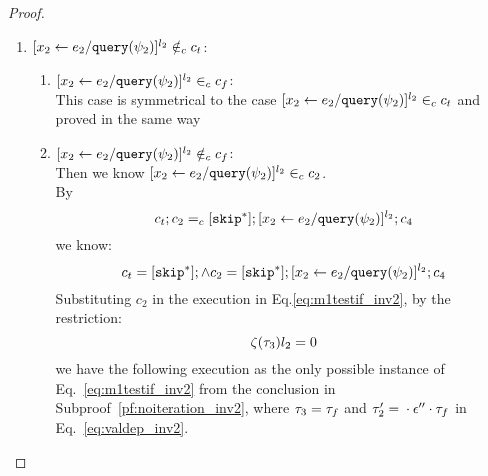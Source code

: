 {\begin{proof}
\begin{subproof}
\begin{enumerate}
we know $\forall \trace, \trace' \in \mathcal{T}$, there doesn't exist execution
 \[
  \config{c_f;c_2, \vtrace} \rightarrow^{*} 
  \config{[\assign{{x}_2}{\expr_2 / \query(\qexpr_2)}]^{l_2};{c}_4', \trace'}
 \]
 This is contradict to the existence of execution in Eq.\ref{eq:m1testif_inv2}.
 \\
 If $[\assign{{x}_2}{\expr_2 / \query(\qexpr_2)}]^{l_2} \in_c c_2$, 
 by uniqueness of label , 
 it must exist in the body of a while command in $c_2$,
 and $\eif ([b]^{l_b}, c_t, c_f) \in_c c_2$ and $[\assign{{x}_2}{\expr_2 / \query(\qexpr_2)}]^{l_2} \in_c c_t$. 
\\
%
i.e., $[\assign{{x}_2}{\expr_2 / \query(\qexpr_2)}]^{l_2}$ will only show up in $c_t$.
\\
%
By $\flowsto$ definition, we have:
\[
  \forall z_i^{r_i} \in \lvar_{c_t},  x_j^{l_j} \in \lvar_c \st x_j \in VAR(b) \land x_j^{l_j} \in \live^{l_b}(c) \implies
  \flowsto(x_j^{l_j}, z_i^{r_i})
\]
%
Since $x_1 \in VAR(b)$ and $x_1^{l_1} \in \live^{l_b}(c)$, we know:
%
\[
\flowsto(x_1^{l_1}, x_2^{l_2})
\]
%
i.e.,
\[
\Big(\exists z_1^{r_1}, \cdots, z_n^{r_n} \in \lvar_{{c}} \st 0 \leq n 
 \land \flowsto(x_1^{l_1}, z_1^{r_1}) \land \cdots \land \flowsto(z_n^{r_n}, {x}_2^{l_2}) \Big)
\]
%
This case is proved.
\item $[\mathrel{ {x}_2 \leftarrow e_2 / {\tt query}(\psi_2) }]^{l_2} \notin_c c_t$:
\begin{enumerate}
 \item $[\mathrel{ {x}_2 \leftarrow e_2 / {\tt query}(\psi_2) }]^{l_2} \in_c c_f$:
 \\
 This case is symmetrical to the case $[\assign{{x}_2}{\expr_2 / \query(\qexpr_2)}]^{l_2} \in_c c_t$ and proved in the same way
 \item $[\mathrel{ {x}_2 \leftarrow e_2 / {\tt query}(\psi_2) }]^{l_2} \notin_c c_f$:
 \\
 Then we know $[\assign{{x}_2}{\expr_2 / \query(\qexpr_2)}]^{l_2} \in_c c_2$.
 \\
 By
 \[
  c_t;c_2 =_c [\mathtt{skip}^*]; [\mathrel{ {x}_2 \leftarrow e_2 / {\tt query}(\psi_2) }]^{l_2};{c}_4
\]
we know:
\[
  c_t = [\mathtt{skip}^*]; \land c_2 = [\mathtt{skip}^*]; [\mathrel{ {x}_2 \leftarrow e_2 / {\tt query}(\psi_2) }]^{l_2};{c}_4
\]
Substituting $c_2$ in the execution in Eq.\ref{eq:m1testif_inv2}, by the restriction:
\[
  \mathtt{\zeta}(\mathtt{\tau}_3)l_2 = 0
\]
we have the following execution as the only possible instance of Eq.~\ref{eq:m1testif_inv2} from the conclusion in Subproof~\ref{pf:noiteration_inv2}, where $\mathtt{\tau}_3 = \mathtt{\tau}_f$ 
and $\mathtt{\tau}_2' = {} \cdot {} \mathtt{\epsilon}'' \cdot \mathtt{\tau}_f$ in Eq.~\ref{eq:valdep_inv2}.

\end{enumerate}
\end{enumerate}
\end{subproof}
\end{proof}}
